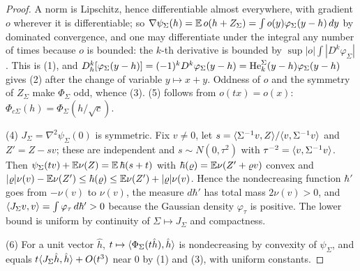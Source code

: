 \begin{proof}
A norm is Lipschitz, hence differentiable almost everywhere, with gradient $o$ wherever it is differentiable; so
$\nabla\psi_\Sigma(h)=\mathbb{E}\,o(h+Z_\Sigma)=\int o(y)\varphi_\Sigma(y-h)\,dy$ by dominated convergence, and one may
differentiate under the integral any number of times because $o$ is bounded: the $k$-th derivative is bounded by
$\sup|o|\int|D^k\varphi_\Sigma|$. This is (1), and $D_h^k[\varphi_\Sigma(y-h)]=(-1)^kD^k\varphi_\Sigma(y-h)
=\mathrm{He}_k^\Sigma(y-h)\varphi_\Sigma(y-h)$ gives (2) after the change of variable $y\mapsto x+y$. Oddness of $o$ and the
symmetry of $Z_\Sigma$ make $\Phi_\Sigma$ odd, whence (3). (5) follows from $o(tx)=o(x)$:
$\Phi_{c\Sigma}(h)=\Phi_\Sigma(h/\sqrt c)$.

(4) $J_\Sigma=\nabla^2\psi_\Sigma(0)$ is symmetric. Fix $v\ne0$, let
$s=\langle \Sigma^{-1}v, Z\rangle/\langle v, \Sigma^{-1}v\rangle$ and $Z'=Z-sv$; these are independent and $s\sim N(0,\tau^2)$ with
$\tau^{-2}=\langle v, \Sigma^{-1}v\rangle$. Then $\psi_\Sigma(tv)+\mathbb{E}\nu(Z)=\mathbb{E}\,\hbar(s+t)$ with $\hbar(\varrho)=\mathbb{E}\nu(Z'+\varrho v)$
convex and $|\varrho|\nu(v)-\mathbb{E}\nu(Z')\le\hbar(\varrho)\le\mathbb{E}\nu(Z')+|\varrho|\nu(v)$. Hence the nondecreasing function
$\hbar'$ goes from $-\nu(v)$ to $\nu(v)$, the measure $d\hbar'$ has total mass $2\nu(v)>0$, and
$\langle J_\Sigma v, v\rangle=\int\varphi_{\tau}\,d\hbar'>0$ because the Gaussian density $\varphi_\tau$ is positive. The lower
bound is uniform by continuity of $\Sigma\mapsto J_\Sigma$ and compactness.

(6) For a unit vector $\hat h$, $t\mapsto\langle \Phi_\Sigma(t\hat h), \hat h\rangle$ is nondecreasing by convexity of
$\psi_\Sigma$, and equals $t\langle J_\Sigma\hat h, \hat h\rangle+O(t^3)$ near $0$ by (1) and (3), with uniform constants.
\end{proof}
